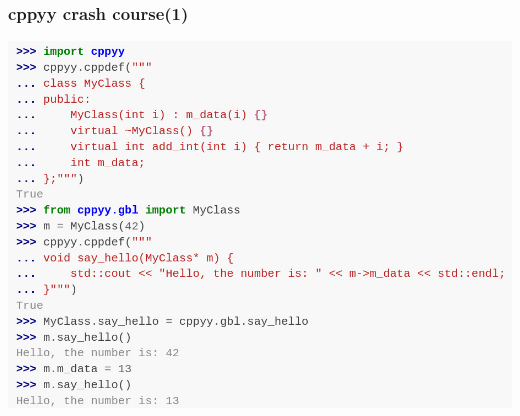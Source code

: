 \begin{frame}
  \frametitle{cppyy crash course(1)}
  \includegraphics[trim={0 0 0 2.45cm},clip,width=\textwidth]{python/cppyy.png}
\end{frame}
